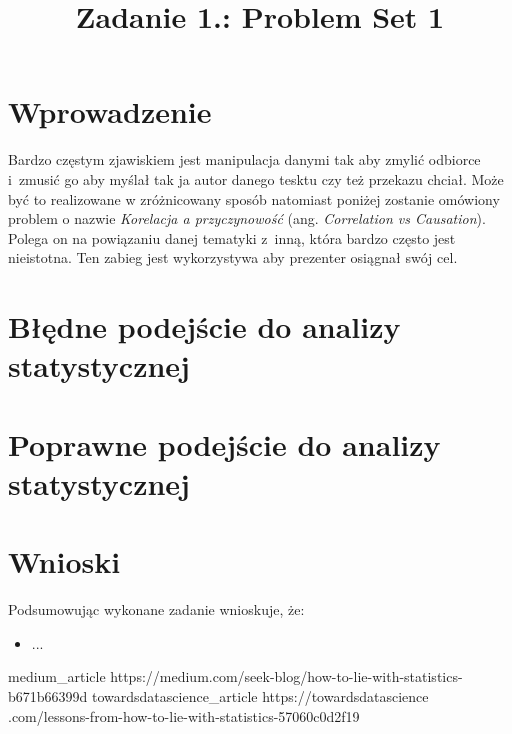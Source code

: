 \documentclass{classrep}
\author{%
    \studentinfo[239676@edu.p.lodz.pl]{Kamil Kowalewski}{239676}
}
\title{Zadanie 1.: Problem Set 1}
\begin{document}
    \maketitle
    \thispagestyle{fancyplain}

    \section{Wprowadzenie} {
        Bardzo częstym zjawiskiem jest manipulacja danymi tak aby zmylić odbiorce
        i~zmusić go aby myślał tak ja autor danego tesktu czy też przekazu chciał.
        Może być to realizowane w zróżnicowany sposób natomiast poniżej zostanie
        omówiony problem o nazwie \emph{Korelacja a przyczynowość}
        (ang. \emph{Correlation vs Causation}). Polega on na powiązaniu danej tematyki
        z~inną, która bardzo często jest nieistotna. Ten zabieg jest wykorzystywa aby
        prezenter osiągnał swój cel.
    }

    \section{Błędne podejście do analizy statystycznej} {

    }

    \section{Poprawne podejście do analizy statystycznej} {

    }

    \section{Wnioski} {
        Podsumowując wykonane zadanie wnioskuje, że:
        \begin{itemize}
            \item ...

        \end{itemize}
    }

    \begin{thebibliography}{0}
        \bibitem
        {medium_article}
        {https://medium.com/seek-blog/how-to-lie-with-statistics-b671b66399d}
        \bibitem
        {towardsdatascience_article}
        {https://towardsdatascience
        .com/lessons-from-how-to-lie-with-statistics-57060c0d2f19}
    \end{thebibliography}
\end{document}
